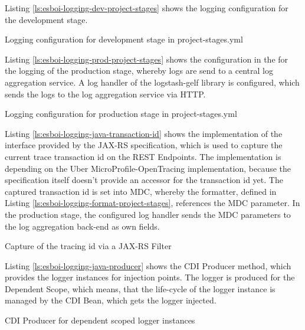 Listing \vref{ls:esboi-logging-dev-project-stages} shows the logging configuration for the development stage.

\begin{listing}[h]
	\caption{Logging configuration for development stage in project-stages.yml}
	\label{ls:esboi-logging-dev-project-stages}
\end{listing}

Listing \vref{ls:esboi-logging-prod-project-stages} shows the configuration in the  for the logging of the production stage, whereby logs are send to a central log aggregation service. A log handler of the logstash-gelf library is configured, which sends the logs to the log aggregation service via HTTP.

\begin{listing}[h]
	\caption{Logging configuration for production stage in project-stages.yml}
	\label{ls:esboi-logging-prod-project-stages}
\end{listing}

Listing \vref{ls:esboi-logging-java-transaction-id} shows the implementation of the interface  provided by the JAX-RS specification, which is used to capture the current trace transaction id on the REST Endpoints. The implementation is depending on the Uber MicroProfile-OpenTracing implementation, because the specification itself doesn't provide an accessor for the transaction id yet. The captured transaction id is set into MDC, whereby the formatter, defined in Listing \vref{ls:esboi-logging-format-project-stages}, references the MDC parameter. In the production stage, the configured log handler sends the MDC parameters to the log aggregation back-end as own fields.

\begin{listing}[h]
	\caption{Capture of the tracing id via a JAX-RS Filter}
	\label{ls:esboi-logging-java-transaction-id}
\end{listing} 

Listing \vref{ls:esboi-logging-java-producer} shows the CDI Producer method, which provides the logger instances for injection points. The logger is produced for the Dependent Scope, which means, that the life-cycle of the logger instance is managed by the CDI Bean, which gets the logger injected.

\begin{listing}[h]
	\caption{CDI Producer for dependent scoped logger instances}
	\label{ls:esboi-logging-java-producer}
\end{listing} 

